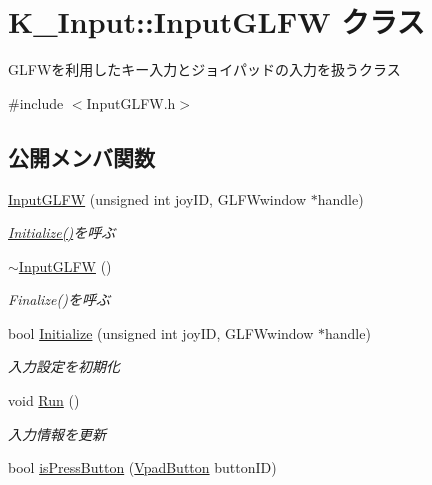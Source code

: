 \hypertarget{class_k___input_1_1_input_g_l_f_w}{}\section{K\+\_\+\+Input\+:\+:Input\+G\+L\+FW クラス}
\label{class_k___input_1_1_input_g_l_f_w}


G\+L\+F\+Wを利用したキー入力とジョイパッドの入力を扱うクラス  




{\ttfamily \#include $<$Input\+G\+L\+F\+W.\+h$>$}

\subsection*{公開メンバ関数}
\begin{DoxyCompactItemize}
\item 
\mbox{\hyperlink{class_k___input_1_1_input_g_l_f_w_a733179261d9b94d99ca3a0a60c93437c}{Input\+G\+L\+FW}} (unsigned int joy\+ID, G\+L\+F\+Wwindow $\ast$handle)
\begin{DoxyCompactList}\small\item\em \mbox{\hyperlink{class_k___input_1_1_input_g_l_f_w_adebfa33e196d75a37714a452622cf90e}{Initialize()}}を呼ぶ \end{DoxyCompactList}\item 
\mbox{\hyperlink{class_k___input_1_1_input_g_l_f_w_a5125b026d330c14dccdb0399e7b6d38d}{$\sim$\+Input\+G\+L\+FW}} ()
\begin{DoxyCompactList}\small\item\em Finalize()を呼ぶ \end{DoxyCompactList}\item 
bool \mbox{\hyperlink{class_k___input_1_1_input_g_l_f_w_adebfa33e196d75a37714a452622cf90e}{Initialize}} (unsigned int joy\+ID, G\+L\+F\+Wwindow $\ast$handle)
\begin{DoxyCompactList}\small\item\em 入力設定を初期化 \end{DoxyCompactList}\item 
void \mbox{\hyperlink{class_k___input_1_1_input_g_l_f_w_a2e6aca10a49dfac3a8d49143910e0a2a}{Run}} ()
\begin{DoxyCompactList}\small\item\em 入力情報を更新 \end{DoxyCompactList}\item 
bool \mbox{\hyperlink{class_k___input_1_1_input_g_l_f_w_a9cad25e32f1286a72592cdd5b9d40cf1}{is\+Press\+Button}} (\mbox{\hyperlink{namespace_k___input_ab1b3c957b1b7070e86ccd1a908f3a101}{Vpad\+Button}} button\+ID)

\end{DoxyCompactItemize}
